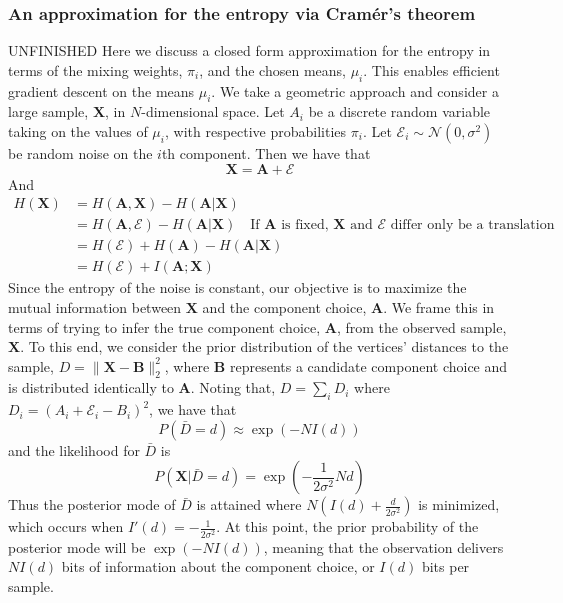 \subsubsection{An approximation for the entropy via Cramér's theorem}
UNFINISHED
Here we discuss a closed form approximation for the entropy in terms of the
mixing weights, $\pi_i$, and the chosen means, $\mu_i$.
This enables efficient gradient descent on the means $\mu_i$.
We take a geometric approach and consider a large sample, $\mathbf{X}$,
in $N$-dimensional space.
Let $A_i$ be a discrete random variable taking on the values of $\mu_i$,
with respective probabilities $\pi_i$. Let $\mathcal{E}_i \sim \mathcal{N}(0, \sigma^2)$ be
random noise on the $i$th component. Then we have that 
$$\mathbf{X} = \mathbf{A} + \mathbf{\mathcal{E}}$$
And
\begin{align*}
    H(\mathbf{X}) &= H(\mathbf{A}, \mathbf{X}) - H(\mathbf{A} | \mathbf{X}) \\
    &= H(\mathbf{A}, \mathbf{\mathcal{E}}) - H(\mathbf{A} | \mathbf{X})  \quad \text{If $\mathbf{A}$ is fixed, $\mathbf{X}$ and $\mathbf{\mathcal{E}}$ differ only be a translation} \\
    &= H(\mathbf{\mathcal{E}}) + H(\mathbf{A}) - H(\mathbf{A} | \mathbf{X}) \\
    &= H(\mathbf{\mathcal{E}}) + I(\mathbf{A}; \mathbf{X})
\end{align*}
Since the entropy of the noise is constant, our objective is to maximize the mutual information
between $\mathbf{X}$ and the component choice, $\mathbf{A}$.
We frame this in terms of trying to infer the true component choice, $\mathbf{A}$, from the observed sample, $\mathbf{X}$.
To this end, we consider the prior distribution of the vertices' distances to the sample, $D = \|\mathbf{X} - \mathbf{B}\|_2^2$,
where $\mathbf{B}$ represents a candidate component choice and is distributed identically to $\mathbf{A}$.
Noting that, $D = \sum_i D_i$ where $D_i = (A_i + \mathcal{E}_i - B_i)^2$, we have that
$$P(\bar{D} = d) \approx \exp\left( - N I(d) \right)$$
and the likelihood for $\bar{D}$ is
$$P(\mathbf{X} | \bar{D} = d) = \exp\left( - \frac{1}{2\sigma^2} N d \right)$$
Thus the posterior mode of $\bar{D}$ is attained where
$N(I(d) + \frac{d}{2\sigma^2})$ is minimized,
which occurs when $I'(d) = - \frac{1}{2\sigma^2}$.
At this point, the prior probability of the posterior mode will be $\exp( - N I(d))$,
meaning that the observation delivers $N I(d)$ bits of information about the component choice,
or $I(d)$ bits per sample.

